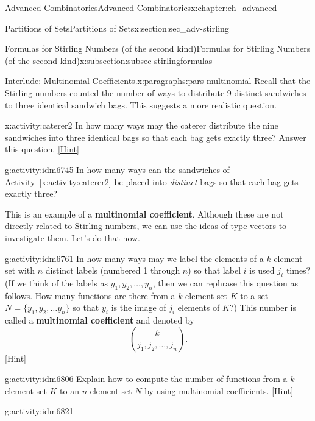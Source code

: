 \documentclass[oneside,10pt,]{book}
\newcommand{\terminology}[1]{\textbf{#1}}
\numberwithin{equation}{chapter}
\begin{document}
\begin{chapterptx}{Advanced Combinatorics}{}{Advanced Combinatorics}{}{}{x:chapter:ch_advanced}
\begin{sectionptx}{Partitions of Sets}{}{Partitions of Sets}{}{}{x:section:sec_adv-stirling}
\begin{subsectionptx}{Formulas for Stirling Numbers (of the second kind)}{}{Formulas for Stirling Numbers (of the second kind)}{}{}{x:subsection:subsec-stirlingformulas}
\begin{paragraphs}{Interlude: Multinomial Coefficients.}{x:paragraphs:pars-multinomial}%
Recall that the Stirling numbers counted the number of ways to distribute 9 distinct sandwiches to three identical sandwich bags.  This suggests a more realistic question.%
\begin{activity}{}{x:activity:caterer2}%
In how many ways may the caterer distribute the nine sandwiches into three identical bags so that each bag gets exactly three? Answer this question.%
\space\hspace*{0pt}\hfill{\tiny\hyperlink{g:hint:idm6739-back}{[Hint]}}\end{activity}
\begin{activity}{}{g:activity:idm6745}%
In how many ways can the sandwiches of \hyperref[x:activity:caterer2]{Activity~\ref{x:activity:caterer2}} be placed into \emph{distinct} bags so that each bag gets exactly three?%
\end{activity}
This is an example of a \terminology{multinomial coefficient}.  Although these are not directly related to Stirling numbers, we can use the ideas of type vectors to investigate them.  Let's do that now.%
\begin{activity}{}{g:activity:idm6761}%
In how many ways may we label the elements of a \(k\)-element set with \(n\) distinct labels (numbered 1 through \(n\)) so that label \(i\) is used \(j_i\) times? (If we think of the labels as \(y_1, y_2, \ldots, y_n\), then we can rephrase this question as follows.  How many functions are there from a \(k\)-element set \(K\) to a set \(N=\{y_1,y_2,\ldots y_n\}\) so that \(y_i\) is the image of \(j_i\) elements of \(K\)?) This number is called a \terminology{multinomial coefficient} and denoted by%
\begin{equation*}
\binom{k}{j_1,j_2,\ldots, j_n}.
\end{equation*}
%
\space\hspace*{0pt}\hfill{\tiny\hyperlink{g:hint:idm6783-back}{[Hint]}}\end{activity}
\begin{activity}{}{g:activity:idm6806}%
Explain how to compute the number of functions from a \(k\)-element set \(K\) to an \(n\)-element set \(N\) by using multinomial coefficients.%
\space\hspace*{0pt}\hfill{\tiny\hyperlink{g:hint:idm6813-back}{[Hint]}}\end{activity}
\begin{activity}{}{g:activity:idm6821}%

\end{activity}
\end{paragraphs}
\end{subsectionptx}
\end{sectionptx}
\end{chapterptx}
\end{document}
